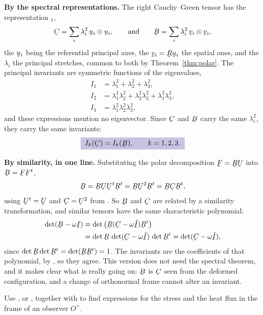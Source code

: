 \begin{solution}
\textbf{By the spectral representations.} The right Cauchy--Green
tensor has the representation $_{1}$,
\[
   \bC=\sum_{i}\lambda^{2}_{i}\,\bu_{i}\otimes\bu_{i},
   \qquad\text{and}\qquad
   \bB=\sum_{i}\lambda^{2}_{i}\,\bv_{i}\otimes\bv_{i},
\]
the $\bu_{i}$ being the referential principal axes, the
$\bv_{i}=\bR\bu_{i}$ the spatial ones, and the $\lambda_{i}$ the
principal stretches, common to both by
Theorem~\ref{thm:polar}. The principal invariants  are
symmetric functions of the eigenvalues,
\[
\begin{aligned}
   I_{1}&=\lambda^{2}_{1}+\lambda^{2}_{2}+\lambda^{2}_{3},\\
   I_{2}&=\lambda^{2}_{1}\lambda^{2}_{2}+\lambda^{2}_{2}\lambda^{2}_{3}
   +\lambda^{2}_{1}\lambda^{2}_{3},\\
   I_{3}&=\lambda^{2}_{1}\lambda^{2}_{2}\lambda^{2}_{3},
\end{aligned}
\]
and these expressions mention no eigenvector. Since $\bC$ and $\bB$
carry the same $\lambda^{2}_{i}$, they carry the same invariants:
\[
   \boxed{\;I_{k}(\bC)=I_{k}(\bB),\qquad k=1,2,3 .\;}
\]

\textbf{By similarity, in one line.} Substituting the polar
decomposition $\bF=\bR\bU$ into $\bB=\bF\bF^{t}$,
\[
   \bB=\bR\bU\bU^{t}\bR^{t}=\bR\bU^{2}\bR^{t}=\bR\bC\bR^{t},
\]
using $\bU^{t}=\bU$ and $\bC=\bU^{2}$ from . So $\bB$ and
$\bC$ are related by a similarity transformation, and similar tensors
have the same characteristic polynomial:
\[
\begin{aligned}
   \det(\bB-\omega\I)&=\det\big(\bR(\bC-\omega\hI)\bR^{t}\big)\\
   &=\det\bR\,\det(\bC-\omega\hI)\,\det\bR^{t}
   =\det(\bC-\omega\hI),
\end{aligned}
\]
since $\det\bR\det\bR^{t}=\det(\bR\bR^{t})=1$. The invariants are the
coefficients of that polynomial, by , so they agree. This
version does not need the spectral theorem, and it makes clear what is
really going on: $\bB$ is $\bC$ seen from the deformed configuration,
and a change of orthonormal frame cannot alter an invariant.
\end{solution}

\begin{problem}
Use , or , together with  to find
expressions for the stress and the heat flux in the frame of an
observer $O^{+}$.
\end{problem}

